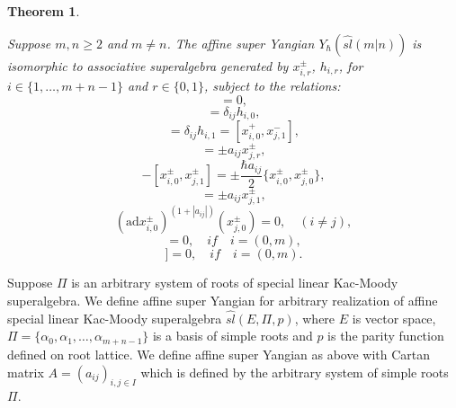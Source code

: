 \documentclass[english]{elsarticle}
\newtheorem{theorem}{Theorem}[section]
\numberwithin{equation}{section}
\begin{document}
\begin{theorem}\label{thm_3.1}

Suppose $m,n\geq 2$ and $m\neq n$. The affine super Yangian $Y_{\hbar}(\hat{sl}(m|n))$ is isomorphic to associative superalgebra generated by $x_{{i},r}^{\pm}$, $h_{i,r}$, for $i \in \{1,\ldots,m+n-1 \}$ and $r \in \{0,1 \}$, subject to the relations:
\begin{equation}
    [h_{{i},r},h_{{j},s}]=0,
\end{equation}
\begin{equation}
    [x_{{i},0}^{+},x_{{j},0}^{-}]=\delta_{ij}h_{i,0},
\end{equation}
\begin{equation}
    [x_{{i},1}^{+},x_{{j},0}^{-}]=\delta_{ij}h_{{i},1}=[x_{{i},0}^{+},x_{{j},1}^{-}],
\end{equation}
\begin{equation}
    [h_{{i},0},x_{i,r}^{\pm}]=\pm a_{ij}x_{j,r}^{\pm},
\end{equation}
\begin{equation}
    [x_{{i},1}^{\pm},x_{{j},0}^{\pm}]-[x_{{i},0}^{\pm},x_{{j},1}^{\pm}]=\pm \frac{ \hbar a_{ij}}{2}\{x_{{i},0}^{\pm},x_{{j},0}^{\pm}\},
\end{equation}
\begin{equation}
    [\tilde{h}_{i,1},x_{j,0}^{\pm}]=\pm a_{ij}x_{j,1}^{\pm},
\end{equation}
\begin{equation}
    (\text{ad} x_{i,0}^{\pm})^{(1+|a_{ij}|)}(x_{j,0}^{\pm}) = 0, \quad (i \neq j),
\end{equation}
\begin{equation}
    [x_{i,0}^{\pm},x_{i,0}^{\pm}]=0, \quad if \quad i=(0,m),
\end{equation}
\begin{equation}
    [[x_{{i-1},0}^{\pm},x_{i,0}^{\pm}][x_{i,0}^{\pm},x_{{i+1},0}^{\pm}]]=0, \quad if \quad i=(0,m).
\end{equation}
\end{theorem}
Suppose $\Pi$ is an arbitrary system of roots of special linear Kac-Moody superalgebra. We define affine super Yangian for arbitrary realization of affine special linear Kac-Moody superalgebra $\hat{sl}(E,\Pi,p)$, where $E$ is vector space, $\Pi=\{\alpha_0,\alpha_1,\ldots,\alpha_{m+n-1}\}$ is a basis of simple roots and $p$ is the parity function defined on root lattice. We define affine super Yangian as above with Cartan matrix $A={(a_{ij})}_{i,j \in I}$ which is defined by the arbitrary system of simple roots $\Pi$.
\end{document}
